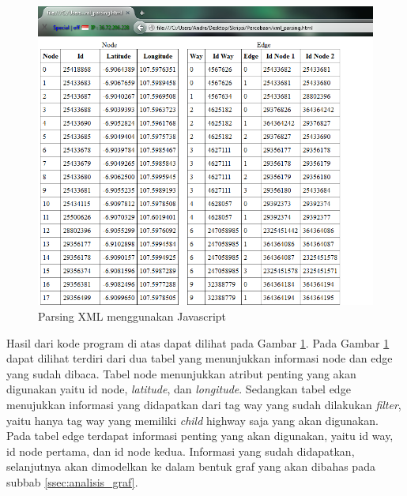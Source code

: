 \begin{figure}[h]
\centering
\includegraphics[scale=0.5]{Gambar/xml_parsing}
\caption[Parsing XML menggunakan Javascript]{Parsing XML menggunakan
Javascript}
\label{fig:xml_parsing}
\end{figure}
Hasil dari kode program di atas dapat dilihat pada Gambar \ref{fig:xml_parsing}.
Pada Gambar \ref{fig:xml_parsing} dapat dilihat terdiri dari dua tabel yang menunjukkan 
informasi node dan edge yang sudah dibaca. Tabel 
node menunjukkan atribut penting yang akan digunakan yaitu id node, \textit{latitude}, dan
\textit{longitude}. Sedangkan tabel edge menujukkan informasi yang didapatkan
dari tag way yang sudah dilakukan \textit{filter}, yaitu hanya tag way yang
memiliki \textit{child} highway saja yang akan digunakan. Pada tabel edge
terdapat informasi penting yang akan digunakan, yaitu id way, id node pertama, 
dan id node kedua. Informasi yang sudah didapatkan, selanjutnya akan dimodelkan
ke dalam bentuk graf yang akan dibahas pada subbab \ref{ssec:analisis_graf}.

